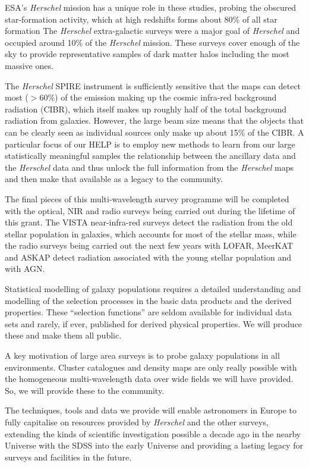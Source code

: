\documentclass[usenatbib]{mnras}
\begin{document}
ESA's {\em Herschel}\citep{pilbrat} mission has a unique role in these studies, probing the
obscured star-formation activity, which at high redshifts forms about 80\% of
all star formation The {\em Herschel} extra-galactic surveys were a major goal
of {\em Herschel} and occupied around 10\% of the {\em Herschel} mission.  These
surveys cover enough of the sky to provide representative samples of dark matter
halos including the most massive ones.

The {\em Herschel} SPIRE instrument is sufficiently sensitive that the maps can
detect most ($>60\%$) of the emission making up the cosmic infra-red background
radiation (CIBR), which itself makes up roughly half of the total background
radiation from galaxies.  However, the large beam size means that the objects
that can be clearly seen as individual sources only make up about 15\% of the
CIBR.  A particular focus of our HELP is to employ new methods to learn from our
large statistically meaningful samples the relationship between the ancillary
data  and the {\em Herschel} data and thus unlock the full information from the
{\em Herschel} maps and then make that available as a legacy to the community.

The final pieces of this multi-wavelength survey programme will be completed
with the optical, NIR and radio surveys being carried out during the lifetime of
this grant.  The VISTA near-infra-red surveys detect the radiation from the old
stellar population in galaxies, which accounts for most of the stellar mass,
while the radio surveys being carried out the next few years with LOFAR, MeerKAT
and ASKAP detect radiation associated with the young stellar population and with
AGN.

Statistical modelling of galaxy populations requires a detailed understanding
and modelling of the selection processes in the basic data products and the
derived properties.   These ``selection functions'' are seldom available for
individual data sets and rarely, if ever, published for derived physical
properties.  We will produce these and make them all public.

A key motivation of large area surveys is to probe galaxy populations in all
environments. Cluster catalogues and density maps are only really possible with
the homogeneous multi-wavelength data over wide fields we will have provided. So,
we will provide these to the community.

The techniques, tools and data we provide will enable astronomers in Europe to
fully capitalise on resources provided by {\em Herschel} and the other surveys,
extending the kinds of scientific investigation possible a decade ago in the
nearby Universe with the SDSS into the early Universe and providing a lasting
legacy for surveys and facilities in the future.  
\end{document}
